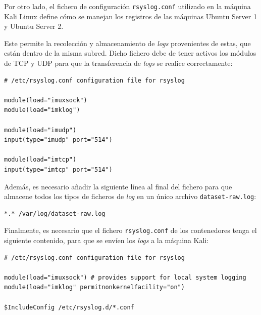Por otro lado, el fichero de configuración \texttt{rsyslog.conf} utilizado en la máquina Kali Linux define cómo se manejan los registros de las máquinas Ubuntu Server 1 y Ubuntu Server 2. 

Este permite la recolección y almacenamiento de \textit{logs} provenientes de estas, que están dentro de la misma subred. Dicho fichero debe de tener activos los módulos de \gls{TCP} y \gls{UDP} para que la transferencia de \textit{logs} se realice correctamente:

\begin{center}
\begin{mdframed}
\footnotesize
    \begin{verbatim}
# /etc/rsyslog.conf configuration file for rsyslog

module(load="imuxsock")
module(load="imklog")

module(load="imudp")
input(type="imudp" port="514")

module(load="imtcp")
input(type="imtcp" port="514")

    \end{verbatim}
\end{mdframed}
\end{center}

Además, es necesario añadir la siguiente línea al final del fichero para que almacene todos los tipos de ficheros de \textit{log} en un único archivo \texttt{dataset-raw.log}:

\begin{center}
\footnotesize
\begin{mdframed}
    \begin{verbatim}
*.* /var/log/dataset-raw.log
    \end{verbatim}
\end{mdframed}
\end{center}

Finalmente, es necesario que el fichero \texttt{rsyslog.conf} de los contenedores tenga el siguiente contenido, para que se envíen los \textit{logs} a la máquina Kali:

\begin{center}
\begin{mdframed}
\footnotesize
    \begin{verbatim}
# /etc/rsyslog.conf configuration file for rsyslog

module(load="imuxsock") # provides support for local system logging
module(load="imklog" permitnonkernelfacility="on")

$IncludeConfig /etc/rsyslog.d/*.conf
    \end{verbatim}
\end{mdframed}
\end{center}


